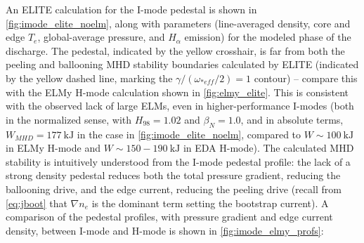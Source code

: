 An ELITE calculation for the I-mode pedestal is shown in \cref{fig:imode_elite_noelm}, along with parameters (line-averaged density, core and edge $T_e$, global-average pressure, and $H_\alpha$ emission) for the modeled phase of the discharge.  The pedestal, indicated by the yellow crosshair, is far from both the peeling and ballooning MHD stability boundaries calculated by ELITE (indicated by the yellow dashed line, marking the $\gamma/(\omega_{*eff}/2) = 1$ contour) -- compare this with the ELMy H-mode calculation shown in \cref{fig:elmy_elite}.  This is consistent with the observed lack of large ELMs, even in higher-performance I-modes (both in the normalized sense, with $H_{98} = 1.02$ and $\beta_N = 1.0$, and in absolute terms, $W_{MHD} = \SI{177}{\kilo\joule}$ in the case in \cref{fig:imode_elite_noelm}, compared to $W \sim \SI{100}{\kilo\joule}$ in ELMy H-mode and $W \sim 150-\SI{190}{\kilo\joule}$ in EDA H-mode).  The calculated MHD stability is intuitively understood from the I-mode pedestal profile: the lack of a strong density pedestal reduces both the total pressure gradient, reducing the ballooning drive, and the edge current, reducing the peeling drive (recall from \cref{eq:jboot} that $\nabla n_e$ is the dominant term setting the bootstrap current).  A comparison of the pedestal profiles, with pressure gradient and edge current density, between I-mode and H-mode is shown in \cref{fig:imode_elmy_profs}:

\begin{figure}[h]
 \pushtooutside
\end{figure}

